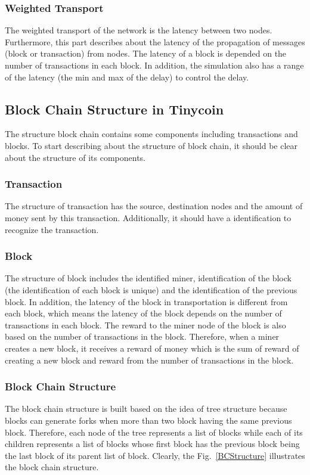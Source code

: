 \documentclass[runningheads,a4paper]{llncs}
\begin{document}
\subsubsection{Weighted Transport}
The weighted transport of the network is the latency between two nodes. 
Furthermore, this part describes about the latency of the propagation of messages (block or transaction) from nodes. 
The latency of a block is depended on the number of transactions in each block.
In addition, the simulation also has a range of the latency (the min and max of the delay) to control the delay.

\subsection{Block Chain Structure in Tinycoin}
\label{BCS}
The structure block chain contains some components including transactions and blocks.
To start describing about the structure of block chain, it should be clear about the structure of its components.

\subsubsection{Transaction}
The structure of transaction has the source, destination nodes and the amount of money sent by this transaction.
Additionally, it should have a identification to recognize the transaction.

\subsubsection{Block}
The structure of block includes the identified miner, identification of the block (the identification of each block is unique) and the identification of the previous block.
In addition, the latency of the block in transportation is different from each block, which means the latency of the block depends on the number of transactions in each block.
The reward to the miner node of the block is also based on the number of transactions in the block. 
Therefore, when a miner creates a new block, it receives a reward of money which is the sum of reward of creating a new block and reward from the number of transactions in the block.

\subsubsection{Block Chain Structure}
The block chain structure is built based on the idea of tree structure because blocks can generate forks when more than two block having the same previous block.
Therefore, each node of the tree represents a list of blocks while each of its children represents a list of blocks whose first block has the previous block being the last block of its parent list of block. Clearly, the Fig.~\ref{BCStructure} illustrates the block chain structure.
\end{document}
